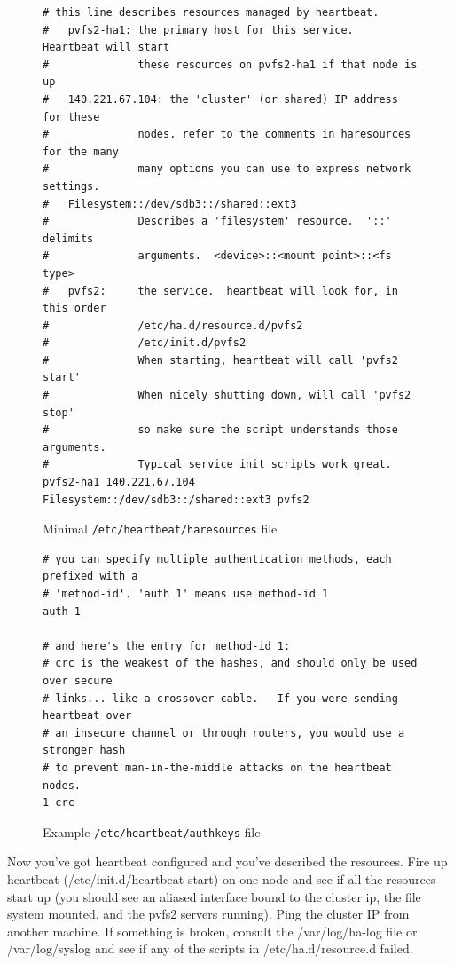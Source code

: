 \documentclass[11pt]{article}
\begin{document}
\begin{figure}
\begin{verbatim}
# this line describes resources managed by heartbeat.  
#   pvfs2-ha1: the primary host for this service.  Heartbeat will start
#              these resources on pvfs2-ha1 if that node is up
#   140.221.67.104: the 'cluster' (or shared) IP address for these
#              nodes. refer to the comments in haresources for the many
#              many options you can use to express network settings. 
#   Filesystem::/dev/sdb3::/shared::ext3
#              Describes a 'filesystem' resource.  '::' delimits
#              arguments.  <device>::<mount point>::<fs type>
#   pvfs2:     the service.  heartbeat will look for, in this order
#              /etc/ha.d/resource.d/pvfs2 
#              /etc/init.d/pvfs2
#              When starting, heartbeat will call 'pvfs2 start'
#              When nicely shutting down, will call 'pvfs2 stop'
#              so make sure the script understands those arguments.
#              Typical service init scripts work great.
pvfs2-ha1 140.221.67.104 Filesystem::/dev/sdb3::/shared::ext3 pvfs2
\end{verbatim}
\caption{Minimal \texttt{/etc/heartbeat/haresources} file}
\label{fig:haresources}
\end{figure}

\begin{figure}
\begin{verbatim}
# you can specify multiple authentication methods, each prefixed with a
# 'method-id'. 'auth 1' means use method-id 1
auth 1

# and here's the entry for method-id 1:
# crc is the weakest of the hashes, and should only be used over secure
# links... like a crossover cable.   If you were sending heartbeat over
# an insecure channel or through routers, you would use a stronger hash
# to prevent man-in-the-middle attacks on the heartbeat nodes.
1 crc
\end{verbatim}
\caption{Example \texttt{/etc/heartbeat/authkeys} file}
\label{fig:authkeys}
\end{figure}


Now you've got heartbeat configured and you've described the resources.
Fire up heartbeat (/etc/init.d/heartbeat start) on one node and see if
all the resources start up (you should see an aliased interface bound to
the cluster ip, the file system mounted, and the pvfs2 servers running).
Ping the cluster IP from another machine.  If something is broken,
consult the /var/log/ha-log file or /var/log/syslog and see if any of
the scripts in /etc/ha.d/resource.d failed.
\end{document}
